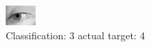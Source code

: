 \begin{figure}[h!]
\begin{center}
\includegraphics[width=0.60\columnwidth]{figures/ID2887_class_3_target_4.png}
\end{center}
\caption{ Classification: 3 actual target: 4}
\label{fig:ID2887_class_3_target_4}
\end{figure}
